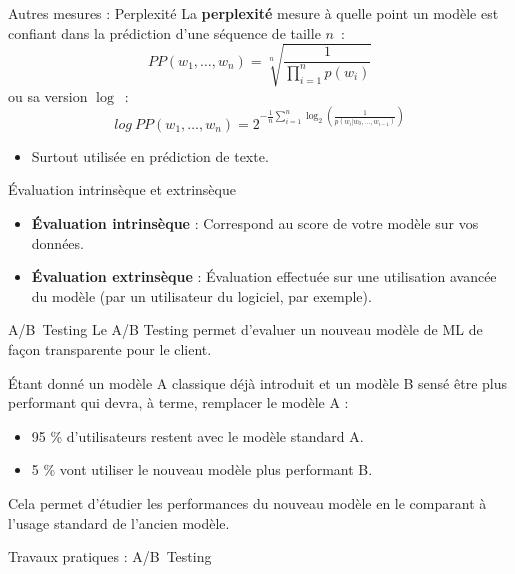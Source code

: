 \begin{frame}{Autres mesures : Perplexité}
  La \textbf{perplexité} mesure à quelle point un modèle est confiant dans la prédiction d'une séquence de taille $n$~:
  \begin{equation*}
    PP(w_1,\dots ,w_n) = \sqrt[n]{\frac{1}{\prod^n_{i=1}p(w_i)}}
  \end{equation*}
  ou sa version $\log$~:
  \begin{equation*}
    log\ PP(w_1,\dots ,w_n) = 2^{-\frac{1}{n}\sum_{i=1}^n \log_2\left(\frac{1}{p(w_i|w_0,\dots,w_{i-1})}\right)}
  \end{equation*}

  \begin{itemize}
    \item Surtout utilisée en prédiction de texte.
  \end{itemize}
  

\end{frame}

\begin{frame}{Évaluation intrinsèque et extrinsèque}
  \begin{itemize}
    \item \textbf{Évaluation intrinsèque} : Correspond au score de votre modèle sur vos données. 
    \item \textbf{Évaluation extrinsèque} : Évaluation effectuée sur une utilisation avancée du modèle (par un utilisateur du logiciel, par exemple).
  \end{itemize}
\end{frame}

\begin{frame}{A/B~Testing}
  Le A/B Testing permet d'evaluer un nouveau modèle de ML de façon transparente pour le client.

  Étant donné un modèle A classique déjà introduit et un modèle B sensé être plus performant qui devra, à terme, remplacer le modèle A :
  \begin{itemize}
    \item 95 \% d'utilisateurs restent avec le modèle standard A.
    \item 5 \% vont utiliser le nouveau modèle plus performant B.
  \end{itemize}
  Cela permet d'étudier les performances du nouveau modèle en le comparant à l'usage standard de l'ancien modèle.
\end{frame}

\begin{frame}{Travaux pratiques : A/B~Testing}
\end{frame}




